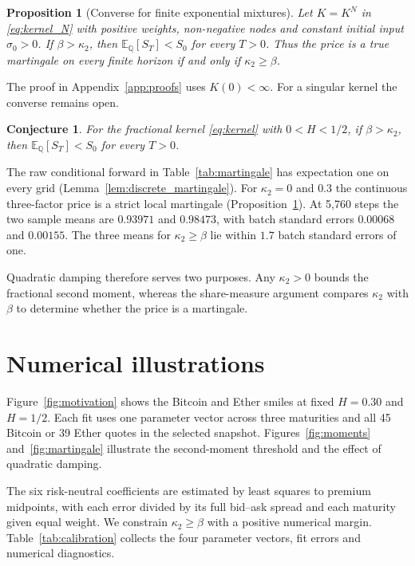 \documentclass{rQUF2e}
\theoremstyle{plain}
\newtheorem{proposition}[theorem]{Proposition}
\newtheorem{conjecture}[theorem]{Conjecture}
\theoremstyle{definition}
\theoremstyle{remark}
\newcommand{\E}{\mathbb{E}}
\newcommand{\Q}{\mathbb{Q}}
\begin{document}
\begin{proposition}[Converse for finite exponential mixtures]\label{prop:finite_converse}
Let $K=K^N$ in \eqref{eq:kernel_N} with positive weights, non-negative nodes and constant initial input $\sigma_0>0$. If $\beta>\kappa_2$, then $\E_\Q[S_T]<S_0$ for every $T>0$. Thus the price is a true martingale on every finite horizon if and only if $\kappa_2\ge\beta$.
\end{proposition}
The proof in Appendix~\ref{app:proofs} uses $K(0)<\infty$. For a singular kernel the converse remains open.

\begin{conjecture}\label{conj:supermartingale}
For the fractional kernel \eqref{eq:kernel} with $0<H<1/2$, if $\beta>\kappa_2$, then $\E_\Q[S_T]<S_0$ for every $T>0$.
\end{conjecture}

The raw conditional forward in Table~\ref{tab:martingale} has expectation one on every grid (Lemma~\ref{lem:discrete_martingale}). For $\kappa_2=0$ and $0.3$ the continuous three-factor price is a strict local martingale (Proposition~\ref{prop:finite_converse}). At 5,760 steps the two sample means are $0.93971$ and $0.98473$, with batch standard errors $0.00068$ and $0.00155$. The three means for $\kappa_2\ge\beta$ lie within $1.7$ batch standard errors of one.

Quadratic damping therefore serves two purposes. Any $\kappa_2>0$ bounds the fractional second moment, whereas the share-measure argument compares $\kappa_2$ with $\beta$ to determine whether the price is a martingale.

\section{Numerical illustrations}\label{sec:illustrations}

Figure~\ref{fig:motivation} shows the Bitcoin and Ether smiles at fixed $H=0.30$ and $H=1/2$. Each fit uses one parameter vector across three maturities and all 45 Bitcoin or 39 Ether quotes in the selected snapshot. Figures~\ref{fig:moments} and~\ref{fig:martingale} illustrate the second-moment threshold and the effect of quadratic damping.

The six risk-neutral coefficients are estimated by least squares to premium midpoints, with each error divided by its full bid--ask spread and each maturity given equal weight. We constrain $\kappa_2\ge\beta$ with a positive numerical margin. Table~\ref{tab:calibration} collects the four parameter vectors, fit errors and numerical diagnostics.
\end{document}
